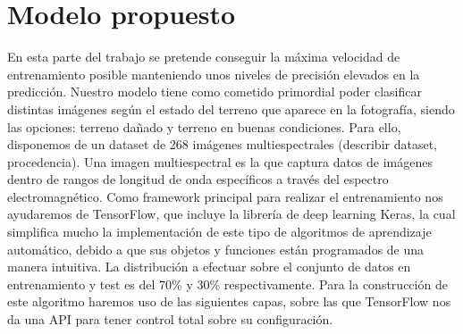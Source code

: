 \section{Modelo propuesto}\label{sec:modelo-propuesto}
En esta parte del trabajo se pretende conseguir la máxima velocidad de entrenamiento posible manteniendo unos niveles de precisión elevados en la predicción.
Nuestro modelo tiene como cometido primordial poder clasificar distintas imágenes según el estado del terreno que aparece en la fotografía, siendo las opciones: terreno dañado y terreno en buenas condiciones.
Para ello, disponemos de un dataset de 268 imágenes multiespectrales (describir dataset, procedencia).
Una imagen multiespectral es la que captura datos de imágenes dentro de rangos de longitud de onda específicos a través del espectro electromagnético.
Como framework principal para realizar el entrenamiento nos ayudaremos de TensorFlow, que incluye la librería de deep learning Keras,
la cual simplifica mucho la implementación de este tipo de algoritmos de aprendizaje automático, debido a que sus objetos y funciones están programados de una manera intuitiva.
La distribución a efectuar sobre el conjunto de datos en entrenamiento y test es del 70\% y 30\% respectivamente.
Para la construcción de este algoritmo haremos uso de las siguientes capas, sobre las que TensorFlow nos da una API para tener control total sobre su configuración.
